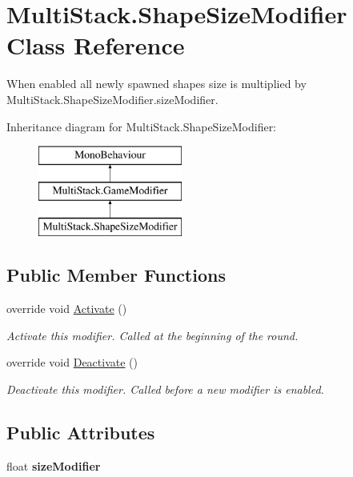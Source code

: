 \hypertarget{class_multi_stack_1_1_shape_size_modifier}{}\section{Multi\+Stack.\+Shape\+Size\+Modifier Class Reference}
\label{class_multi_stack_1_1_shape_size_modifier}


When enabled all newly spawned shapes size is multiplied by Multi\+Stack.\+Shape\+Size\+Modifier.\+size\+Modifier.  


Inheritance diagram for Multi\+Stack.\+Shape\+Size\+Modifier\+:\begin{figure}[H]
\begin{center}
\leavevmode
\includegraphics[height=3.000000cm]{class_multi_stack_1_1_shape_size_modifier}
\end{center}
\end{figure}
\subsection*{Public Member Functions}
\begin{DoxyCompactItemize}
\item 
override void \hyperlink{class_multi_stack_1_1_shape_size_modifier_a5dd27bb25d63f05f2d6c1f4c4f88fd3f}{Activate} ()
\begin{DoxyCompactList}\small\item\em Activate this modifier. Called at the beginning of the round. \end{DoxyCompactList}\item 
override void \hyperlink{class_multi_stack_1_1_shape_size_modifier_a74e6cc4af581e1167679d0b3d9740785}{Deactivate} ()
\begin{DoxyCompactList}\small\item\em Deactivate this modifier. Called before a new modifier is enabled. \end{DoxyCompactList}\end{DoxyCompactItemize}
\subsection*{Public Attributes}
\begin{DoxyCompactItemize}
\item 
\hypertarget{class_multi_stack_1_1_shape_size_modifier_ad1b3c3fd79bfc2ed70f471d73c983749}{}float {\bfseries size\+Modifier}\label{class_multi_stack_1_1_shape_size_modifier_ad1b3c3fd79bfc2ed70f471d73c983749}

\end{DoxyCompactItemize}


